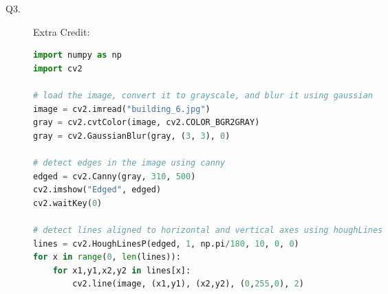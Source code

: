 \documentclass{csc_assignment4}
\begin{document}
\begin{description}
\newpage
\item[Q3.]
Extra Credit:
\begin{lstlisting}[language=Python]
import numpy as np
import cv2

# load the image, convert it to grayscale, and blur it using gaussian
image = cv2.imread("building_6.jpg")
gray = cv2.cvtColor(image, cv2.COLOR_BGR2GRAY)
gray = cv2.GaussianBlur(gray, (3, 3), 0)

# detect edges in the image using canny
edged = cv2.Canny(gray, 310, 500)
cv2.imshow("Edged", edged)
cv2.waitKey(0)

# detect lines aligned to horizontal and vertical axes using houghLines
lines = cv2.HoughLinesP(edged, 1, np.pi/180, 10, 0, 0)
for x in range(0, len(lines)):
    for x1,y1,x2,y2 in lines[x]:
        cv2.line(image, (x1,y1), (x2,y2), (0,255,0), 2)



\end{lstlisting}
\end{description}
\end{document}
